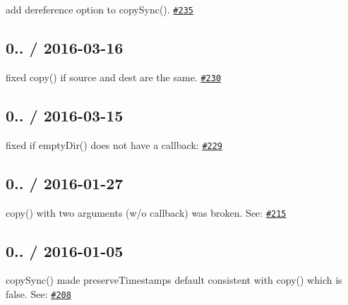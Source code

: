 \begin{DoxyItemize}
\item add {\ttfamily dereference} option to {\ttfamily copy\+Sync()}. \href{https://github.com/jprichardson/node-fs-extra/pull/235}{\tt \#235}
\end{DoxyItemize}

\subsection*{0.. / 2016-\/03-\/16 }


\begin{DoxyItemize}
\item fixed {\ttfamily copy()} if source and dest are the same. \href{https://github.com/jprichardson/node-fs-extra/pull/230}{\tt \#230}
\end{DoxyItemize}

\subsection*{0.. / 2016-\/03-\/15 }


\begin{DoxyItemize}
\item fixed if {\ttfamily empty\+Dir()} does not have a callback\+: \href{https://github.com/jprichardson/node-fs-extra/pull/229}{\tt \#229}
\end{DoxyItemize}

\subsection*{0.. / 2016-\/01-\/27 }


\begin{DoxyItemize}
\item {\ttfamily copy()} with two arguments (w/o callback) was broken. See\+: \href{https://github.com/jprichardson/node-fs-extra/pull/215}{\tt \#215}
\end{DoxyItemize}

\subsection*{0.. / 2016-\/01-\/05 }


\begin{DoxyItemize}
\item {\ttfamily copy\+Sync()} made {\ttfamily preserve\+Timestamps} default consistent with {\ttfamily copy()} which is {\ttfamily false}. See\+: \href{https://github.com/jprichardson/node-fs-extra/pull/208}{\tt \#208}
\end{DoxyItemize}

